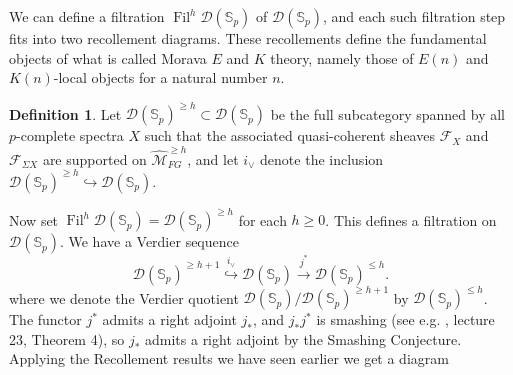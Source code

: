 \documentclass[a4paper]{article} %
\theoremstyle{definition}
\newtheorem{definition}[theorem]{Definition}
\newcommand{\moduliH}{\widehat{\mathcal{M}}_{FG}}
\newcommand{\Spp}{\mathcal{D}(\mathbb{S}_p)}
\begin{document}
We can define a filtration $\operatorname{Fil}^h \Spp$ of $\Spp$, and each such filtration step fits into two recollement diagrams. These recollements define the fundamental objects of what is called Morava $E$ and $K$ theory, namely those of $E(n)$ and $K(n)$-local objects for a natural number $n$.
\begin{definition}
  Let $\Spp^{\ge h} \subset \Spp$
  be the full subcategory spanned by all $p$-complete spectra $X$ such that the associated quasi-coherent sheaves $\mathcal{F}_X$ and $\mathcal{F}_{\Sigma X}$ are supported on $\moduliH^{\ge h}$, and let $i_\vee$ denote the inclusion $\Spp^{\ge h} \hookrightarrow \Spp$.
\end{definition}
Now set $\operatorname{Fil}^h \Spp = \Spp^{\ge h}$ for each $h \ge 0$. This defines a filtration on $\Spp$. We have a Verdier sequence
\[
\Spp^{\ge h+1} \overset{i_\vee}{\hookrightarrow} \Spp \overset{j^*}{\to} \Spp^{\le h}.
\]
where we denote the Verdier quotient $\Spp/\Spp^{\ge h+1}$ by $\Spp^{\le h}$. The functor $j^*$ admits a right adjoint $j_*$, and $j_*j^*$ is smashing (see e.g. \cite{luriechromatichomotopytheorynotes}, lecture 23, Theorem 4), so $j_*$ admits a right adjoint by the Smashing Conjecture. Applying the Recollement results we have seen earlier we get a diagram
\iffalse
\begin{center}
  \begin{tikzcd}
    X \arrow[dr, shift left=1ex, "i_\vee"] & & \\
    & X \arrow{r} \arrow[ul, shift right=1ex, "i_\vee"] & X \\
    X \arrow{ur} & &
  \end{tikzcd}
\end{center}
\fi
\end{document}
